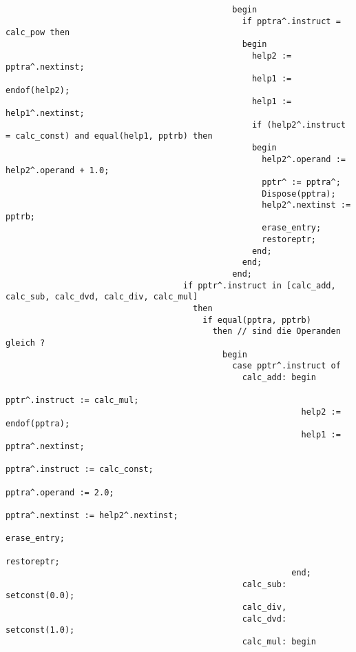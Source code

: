 \begin{refsection}
\begin{lstlisting}
                                              begin
                                                if pptra^.instruct = calc_pow then
                                                begin
                                                  help2 := pptra^.nextinst;
                                                  help1 := endof(help2);
                                                  help1 := help1^.nextinst;
                                                  if (help2^.instruct = calc_const) and equal(help1, pptrb) then
                                                  begin
                                                    help2^.operand := help2^.operand + 1.0;
                                                    pptr^ := pptra^;
                                                    Dispose(pptra);
                                                    help2^.nextinst := pptrb;
                                                    erase_entry;
                                                    restoreptr;
                                                  end;
                                                end;
                                              end;
                                    if pptr^.instruct in [calc_add, calc_sub, calc_dvd, calc_div, calc_mul]
                                      then
                                        if equal(pptra, pptrb)
                                          then // sind die Operanden gleich ?
                                            begin
                                              case pptr^.instruct of
                                                calc_add: begin
                                                            pptr^.instruct := calc_mul;
                                                            help2 := endof(pptra);
                                                            help1 := pptra^.nextinst;
                                                            pptra^.instruct := calc_const;
                                                            pptra^.operand := 2.0;
                                                            pptra^.nextinst := help2^.nextinst;
                                                            erase_entry;
                                                            restoreptr;
                                                          end;
                                                calc_sub: setconst(0.0);
                                                calc_div,
                                                calc_dvd: setconst(1.0);
                                                calc_mul: begin

\end{lstlisting}
\end{refsection}
